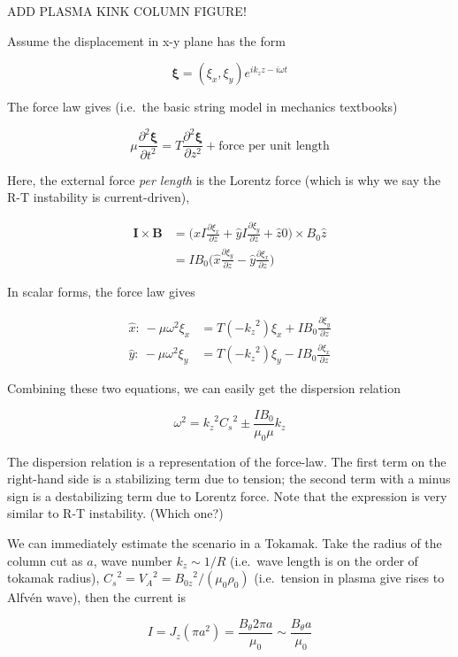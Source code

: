 \documentclass[
  notoc %
]{tufte-book}
\begin{document}
ADD PLASMA KINK COLUMN FIGURE!

Assume the displacement in x-y plane has the form

\[
\pmb{\xi} = (\xi_x,\xi_y)e^{ik_z z-i\omega t}
\]

The force law gives (i.e.~the basic string model in mechanics textbooks)

\[
\mu\frac{\partial^2\pmb{\xi}}{\partial t^2}=T\frac{\partial^2\pmb{\xi}}{\partial z^2}+ \text{force per unit length}
\]

Here, the external force \emph{per length} is the Lorentz force (which
is why we say the R-T instability is current-driven),

\[
\begin{aligned}
\mathbf{I}\times\mathbf{B}&=\Big( \hat{x}I\frac{\partial \xi_x}{\partial z}+\hat{y}I\frac{\partial\xi_y}{\partial z}+\hat{z}0 \Big)\times B_0\hat{z} \\
&=IB_0 \Big( \hat{x}\frac{\partial\xi_y}{\partial z}-\hat{y}\frac{\partial \xi_x}{\partial z}\Big)
\end{aligned}
\]

In scalar forms, the force law gives

\[
\begin{aligned}
\hat{x}:\ -\mu\omega^2 \xi_x &= T(-{k_z}^2)\xi_x + IB_0 \frac{\partial \xi_y}{\partial z}\\
\hat{y}:\ -\mu\omega^2\xi_y &= T(-{k_z}^2)\xi_y - IB_0 \frac{\partial \xi_x}{\partial z}
\end{aligned}
\]

Combining these two equations, we can easily get the dispersion relation

\[
\omega^2 = {k_z}^2{C_s}^2 \pm \frac{IB_0}{\mu_0 \mu}k_z
\]

The dispersion relation is a representation of the force-law. The first
term on the right-hand side is a stabilizing term due to tension; the
second term with a minus sign is a destabilizing term due to Lorentz
force. Note that the expression is very similar to R-T instability.
(Which one?)

We can immediately estimate the scenario in a Tokamak. Take the radius
of the column cut as \(a\), wave number \(k_z\sim 1/R\) (i.e.~wave
length is on the order of tokamak radius),
\({C_s}^2={V_A}^2={B_{0z}}^2/(\mu_0\rho_0)\) (i.e.~tension in plasma
give rises to Alfvén wave), then the current is

\[
I=J_z(\pi a^2)=\frac{B_\theta 2\pi a}{\mu_0} \sim \frac{B_\theta a}{\mu_0}
\]
\end{document}
